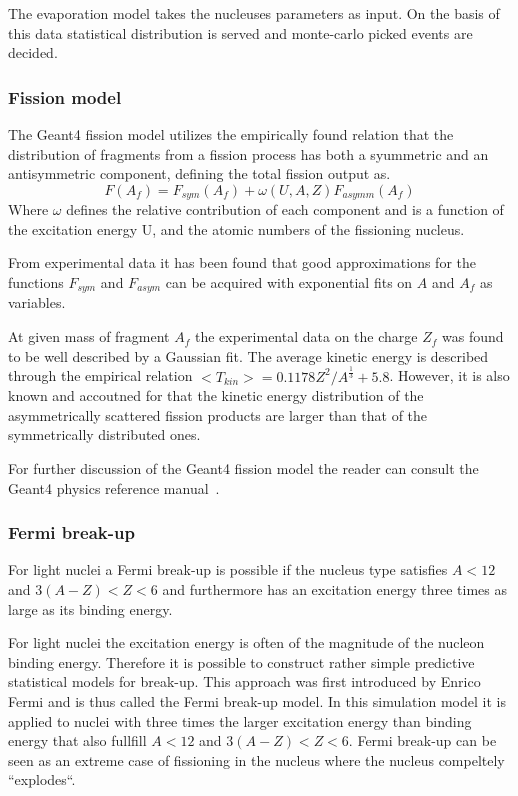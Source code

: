 The evaporation model takes the nucleuses parameters as input. On the basis of this data statistical distribution is served and monte-carlo picked events are decided.

\subsubsection{Fission model}

The Geant4 fission model utilizes the empirically found relation that the distribution of fragments from a fission process has both a syummetric and an antisymmetric component, defining the total fission output as.
\begin{equation}
 F(A_f) = F_{sym}(A_f) + \omega(U,A,Z) F_{asymm}(A_f) 
\label{fissionSymmetricAsymmetric}
\end{equation}
Where $\omega$ defines the relative contribution of each component and is a function of the excitation energy U, and the atomic numbers of the fissioning nucleus.

From experimental data it has been found that good approximations for the functions $F_{sym}$ and $F_{asym}$ can be acquired with exponential fits on $A$ and $A_f$ as variables.

At given mass of fragment $A_f$ the experimental data on the charge $Z_f$ was found to be well described by a Gaussian fit. The average kinetic energy is described through the empirical relation $<T_{kin}>=0.1178Z^2/A^\frac{1}{3} + 5.8$. However, it is also known and accoutned for that the kinetic energy distribution of the asymmetrically scattered fission products are larger than that of the symmetrically distributed ones. 

For further discussion of the Geant4 fission model the reader can consult the Geant4 physics reference manual~\cite[Chapter 31.]{physicsManual}.

\subsubsection{Fermi break-up}
For light nuclei a Fermi break-up is possible if the nucleus type satisfies $A < 12$ and $3(A - Z) < Z < 6$ and furthermore has an excitation energy three times as large as its binding energy.

For light nuclei the excitation energy is often of the magnitude of the nucleon binding energy. Therefore it is possible to construct rather simple predictive statistical models for break-up. This approach was first introduced by Enrico Fermi and is thus called the Fermi break-up model. In this simulation model it is applied to nuclei with three times the larger excitation energy than binding energy that also fullfill $A < 12$ and $3(A - Z) < Z < 6$. Fermi break-up can be seen as an extreme case of fissioning in the nucleus where the nucleus compeltely ``explodes``. %
\clearpage
